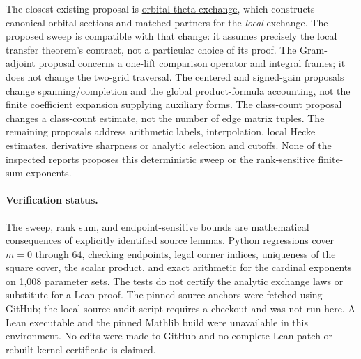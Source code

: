 \documentclass[11pt]{article}
\newcommand{\base}{https://github.com/VladimirReshetnikov/ProveIt/blob/835c3695d07c0f77060c5cc63f92eeb52a7d21c2/Analysis/GeneralizedRiemannHypothesis}
\begin{document}
The closest existing proposal is \href{\base/docs/proposals/orbital_theta_exchange/orbital_theta_exchange.tex}{orbital theta exchange}, which constructs canonical orbital sections and matched partners for the \emph{local} exchange. The proposed sweep is compatible with that change: it assumes precisely the local transfer theorem's contract, not a particular choice of its proof. The Gram-adjoint proposal concerns a one-lift comparison operator and integral frames; it does not change the two-grid traversal. The centered and signed-gain proposals change spanning/completion and the global product-formula accounting, not the finite coefficient expansion supplying auxiliary forms. The class-count proposal changes a class-count estimate, not the number of edge matrix tuples. The remaining proposals address arithmetic labels, interpolation, local Hecke estimates, derivative sharpness or analytic selection and cutoffs. None of the inspected reports proposes this deterministic sweep or the rank-sensitive finite-sum exponents.

\paragraph{Verification status.} The sweep, rank sum, and endpoint-sensitive bounds are mathematical consequences of explicitly identified source lemmas. Python regressions cover $m=0$ through $64$, checking endpoints, legal corner indices, uniqueness of the square cover, the scalar product, and exact arithmetic for the cardinal exponents on 1,008 parameter sets. The tests do not certify the analytic exchange laws or substitute for a Lean proof. The pinned source anchors were fetched using GitHub; the local source-audit script requires a checkout and was not run here. A Lean executable and the pinned Mathlib build were unavailable in this environment. No edits were made to GitHub and no complete Lean patch or rebuilt kernel certificate is claimed.
\end{document}
